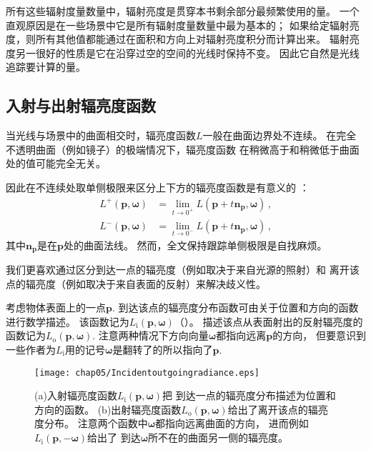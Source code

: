 所有这些辐射度量数量中，辐射亮度是贯穿本书剩余部分最频繁使用的量。
一个直观原因是在一些场景中它是所有辐射度量数量中最为基本的；
如果给定辐射亮度，则所有其他值都能通过在面积和方向上对辐射亮度积分而计算出来。
辐射亮度另一很好的性质是它在沿穿过空的空间的光线时保持不变。
因此它自然是光线追踪要计算的量。

\subsection{入射与出射辐亮度函数}\label{sub:入射与出射辐亮度函数}
当光线与场景中的曲面相交时，辐亮度函数$L$一般在曲面边界处不连续。
在完全不透明曲面（例如镜子）的极端情况下，辐亮度函数
在稍微高于和稍微低于曲面处的值可能完全无关。

因此在不连续处取单侧极限来区分上下方的辐亮度函数是有意义的
：
\begin{align}\label{eq:5.3}
    L^+({\bm p},{\bm\omega}) & =\lim\limits_{t\rightarrow 0^+}{L({\bm p}+t{\bm n}_{\bm p},{\bm\omega})}\, ,\nonumber \\
    L^-({\bm p},{\bm\omega}) & =\lim\limits_{t\rightarrow 0^-}{L({\bm p}+t{\bm n}_{\bm p},{\bm\omega})}\, ,
\end{align}
其中${\bm n}_{\bm p}$是在$\bm p$处的曲面法线。
然而，全文保持跟踪单侧极限是自找麻烦。

我们更喜欢通过区分到达一点的辐亮度（例如取决于来自光源的照射）和
离开该点的辐亮度（例如取决于来自表面的反射）来解决歧义性。

考虑物体表面上的一点$\bm p$.
到达该点的辐亮度分布函数可由关于位置和方向的函数进行数学描述。
该函数记为$L_{\mathrm{i}}({\bm p},{\bm\omega})$（）。
描述该点从表面射出的反射辐亮度的函数记为$L_{\mathrm{o}}({\bm p},{\bm\omega})$.
注意两种情况下方向向量$\bm\omega$都指向远离$\bm p$的方向，
但要意识到一些作者为$L_{\mathrm{i}}$用的记号$\bm\omega$是翻转了的所以指向了$\bm p$.
\begin{figure}[htbp]
    \centering\texttt{[image: chap05/Incidentoutgoingradiance.eps]}
    \caption{(a)入射辐亮度函数$L_{\mathrm{i}}({\bm p},{\bm\omega})$把
    到达一点的辐亮度分布描述为位置和方向的函数。
    (b)出射辐亮度函数$L_{\mathrm{o}}({\bm p},{\bm\omega})$给出了离开该点的辐亮度分布。
    注意两个函数中$\bm\omega$都指向远离曲面的方向，
    进而例如$L_{\mathrm{i}}({\bm p},-{\bm\omega})$给出了
    到达$\bm\omega$所不在的曲面另一侧的辐亮度。}
    \label{fig:5.11}
\end{figure}

